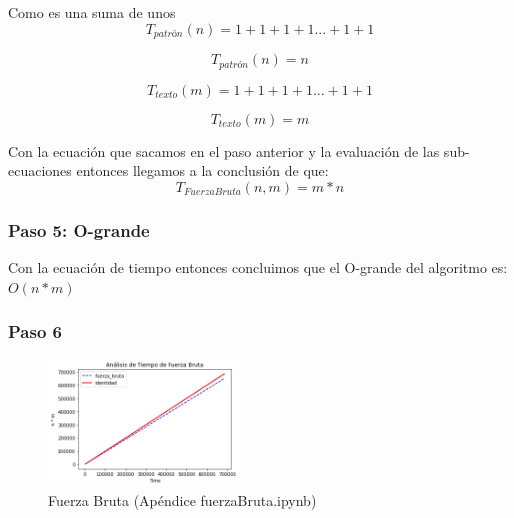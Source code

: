 Como es una suma de unos
\[T_{patrón}(n) = 1 + 1 + 1 + 1 ... + 1 + 1\]

\[T_{patrón}(n) = n \]

\[T_{texto}(m) = 1 + 1 + 1 + 1 ... + 1 + 1\]

\[T_{texto}(m) = m \]

Con la ecuación que sacamos en el paso anterior y la evaluación de las sub-ecuaciones entonces llegamos a la conclusión de que:
\[T_{Fuerza Bruta}(n,m) = m*n\]


\subsubsection*{Paso 5: O-grande}
Con la ecuación de tiempo entonces concluimos que el O-grande del algoritmo es: $O(n*m)$

\subsubsection*{Paso 6}

\begin{figure} [H]
    \includegraphics[width=0.45\textwidth]{../codigoPythonJupyter/FuerzaBruta/Final.png}
    \caption{Fuerza Bruta (Apéndice fuerzaBruta.ipynb)}
    \label{fig:fb}
\end{figure}

